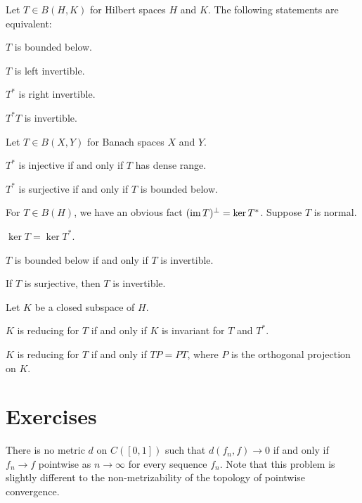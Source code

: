 \documentclass{../note}
\begin{document}
\begin{prb}
Let $T\in B(H,K)$ for Hilbert spaces $H$ and $K$.
The following statements are equivalent:
\begin{parts}
\item $T$ is bounded below.
\item $T$ is left invertible.
\item $T^*$ is right invertible.
\item $T^*T$ is invertible.
\end{parts}
\end{prb}

\begin{prb}
Let $T\in B(X,Y)$ for Banach spaces $X$ and $Y$.
\begin{parts}
\item $T^*$ is injective if and only if $T$ has dense range.
\item $T^*$ is surjective if and only if $T$ is bounded below.
\end{parts}
\end{prb}

\begin{prb}
For $T\in B(H)$, we have an obvious fact $(\operatorname{im} T)^\perp=\ker T^*$.
Suppose $T$ is normal.
\begin{parts}
\item $\ker T=\ker T^*$.
\item $T$ is bounded below if and only if $T$ is invertible.
\item If $T$ is surjective, then $T$ is invertible.
\end{parts}
\end{prb}

\begin{prb}
Let $K$ be a closed subspace of $H$.
\begin{parts}
\item $K$ is reducing for $T$ if and only if $K$ is invariant for $T$ and $T^*$.
\item $K$ is reducing for $T$ if and only if $TP=PT$, where $P$ is the orthogonal projection on $K$.
\end{parts}
\end{prb}




\section*{Exercises}
\begin{prb}
There is no metric $d$ on $C([0,1])$ such that $d(f_n,f)\to0$ if and only if $f_n\to f$ pointwise as $n\to\infty$ for every sequence $f_n$.
Note that this problem is slightly different to the non-metrizability of the topology of pointwise convergence.
\end{prb}
\end{document}
